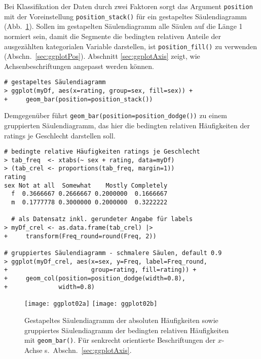 Bei Klassifikation der Daten durch zwei Faktoren sorgt das Argument \lstinline!position! mit der Voreinstellung \lstinline!position_stack()! für ein gestapeltes Säulendiagramm (Abb.\ \ref{fig:ggplot02b}). Sollen im gestapelten Säulendiagramm alle Säulen auf die Länge 1 normiert sein, damit die Segmente die bedingten relativen Anteile der ausgezählten kategorialen Variable darstellen, ist \lstinline!position_fill()! zu verwenden (Abschn.\ \ref{sec:ggplotPos}). Abschnitt \ref{sec:ggplotAxis} zeigt, wie Achsenbeschriftungen angepasst werden können.
\begin{lstlisting}
# gestapeltes Säulendiagramm
> ggplot(myDf, aes(x=rating, group=sex, fill=sex)) +
+     geom_bar(position=position_stack())
\end{lstlisting}

Demgegenüber führt \lstinline!geom_bar(position=position_dodge())! zu einem gruppierten Säulendiagramm, das hier die bedingten relativen Häufigkeiten der ratings je Geschlecht darstellen soll.
\begin{lstlisting}
# bedingte relative Häufigkeiten ratings je Geschlecht
> tab_freq  <- xtabs(~ sex + rating, data=myDf)
> (tab_crel <- proportions(tab_freq, margin=1))
rating
sex Not at all  Somewhat    Mostly Completely
  f  0.3666667 0.2666667 0.2000000  0.1666667
  m  0.1777778 0.3000000 0.2000000  0.3222222

  # als Datensatz inkl. gerundeter Angabe für labels
> myDf_crel <- as.data.frame(tab_crel) |>
+     transform(Freq_round=round(Freq, 2))

# gruppiertes Säulendiagramm - schmalere Säulen, default 0.9
> ggplot(myDf_crel, aes(x=sex, y=Freq, label=Freq_round,
+                       group=rating, fill=rating)) +
+     geom_col(position=position_dodge(width=0.8),
+              width=0.8)
\end{lstlisting}

\begin{figure}[ht]
\centering
\texttt{[image: ggplot02a]}
\texttt{[image: ggplot02b]}
\vspace*{-0.5em}
\caption{Gestapeltes Säulendiagramm der absoluten Häufigkeiten sowie gruppiertes Säulendiagramm der bedingten relativen Häufigkeiten mit \lstinline!geom_bar()!. Für senkrecht orientierte Beschriftungen der $x$-Achse s.\ Abschn.\ \ref{sec:ggplotAxis}.}
\label{fig:ggplot02b}
\end{figure}

